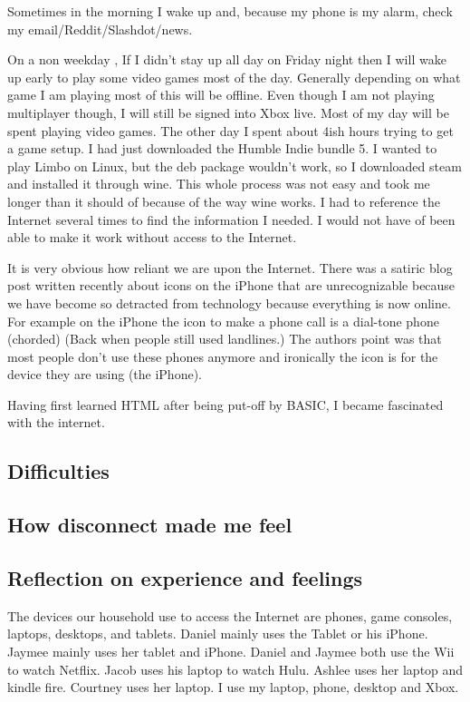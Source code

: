 \documentclass[12pt,letterpaper]{article}
\begin{document}
Sometimes in the morning I wake up and, because my phone is my alarm,
check my email/Reddit/Slashdot/news.


On a non weekday , If I didn't stay up all day on Friday night then I
will wake up early to play some video games most of the day. Generally
depending on what game I am playing most of this will be offline. Even
though I am not playing multiplayer though, I will still be signed into
Xbox live. Most of my day will be spent playing video games. The other
day I spent about 4ish hours trying to get a game setup. I had just
downloaded the Humble Indie bundle 5. I wanted to play Limbo on Linux,
but the deb package wouldn't work, so I downloaded steam and installed
it through wine. This whole process was not easy and took me longer than
it should of because of the way wine works. I had to reference the
Internet several times to find the information I needed. I would not
have of been able to make it work without access to the Internet.

It is very obvious how reliant we are upon the Internet. There was a
satiric blog post written recently about icons on the iPhone that are
unrecognizable because we have become so detracted from technology
because everything is now online. For example on the iPhone the icon to
make a phone call is a dial-tone phone (chorded) (Back when people still
used landlines.)  The authors point was that most people don't use these
phones anymore and ironically the icon is for the device they are using
(the iPhone).


Having first learned HTML after being put-off by BASIC, I became
fascinated with the internet.

\subsection{Difficulties} \subsection{How disconnect made me feel}
\subsection{Reflection on experience and feelings}

The devices our household use to access the Internet are phones, game
consoles, laptops, desktops, and tablets. Daniel mainly uses the Tablet
or his iPhone. Jaymee mainly uses her tablet and iPhone. Daniel and
Jaymee both use the Wii to watch Netflix. Jacob uses his laptop to watch
Hulu. Ashlee uses her laptop and kindle fire. Courtney uses her laptop.
I use my laptop, phone, desktop and Xbox.
\end{document}
